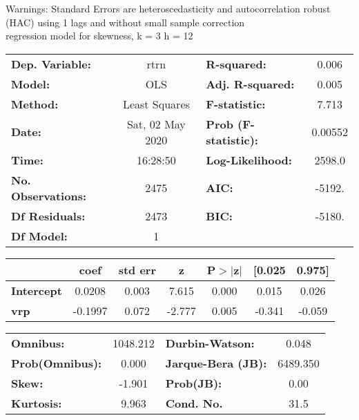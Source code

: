 Warnings: \newline
 [1] Standard Errors are heteroscedasticity and autocorrelation robust (HAC) using 1 lags and without small sample correction\\ 

regression model for skewness, k = 3 h = 12\begin{center}
\begin{tabular}{lclc}
\toprule
\textbf{Dep. Variable:}    &       rtrn       & \textbf{  R-squared:         } &     0.006   \\
\textbf{Model:}            &       OLS        & \textbf{  Adj. R-squared:    } &     0.005   \\
\textbf{Method:}           &  Least Squares   & \textbf{  F-statistic:       } &     7.713   \\
\textbf{Date:}             & Sat, 02 May 2020 & \textbf{  Prob (F-statistic):} &  0.00552    \\
\textbf{Time:}             &     16:28:50     & \textbf{  Log-Likelihood:    } &    2598.0   \\
\textbf{No. Observations:} &        2475      & \textbf{  AIC:               } &    -5192.   \\
\textbf{Df Residuals:}     &        2473      & \textbf{  BIC:               } &    -5180.   \\
\textbf{Df Model:}         &           1      & \textbf{                     } &             \\
\bottomrule
\end{tabular}
\begin{tabular}{lcccccc}
                   & \textbf{coef} & \textbf{std err} & \textbf{z} & \textbf{P$> |$z$|$} & \textbf{[0.025} & \textbf{0.975]}  \\
\midrule
\textbf{Intercept} &       0.0208  &        0.003     &     7.615  &         0.000        &        0.015    &        0.026     \\
\textbf{vrp}       &      -0.1997  &        0.072     &    -2.777  &         0.005        &       -0.341    &       -0.059     \\
\bottomrule
\end{tabular}
\begin{tabular}{lclc}
\textbf{Omnibus:}       & 1048.212 & \textbf{  Durbin-Watson:     } &    0.048  \\
\textbf{Prob(Omnibus):} &   0.000  & \textbf{  Jarque-Bera (JB):  } & 6489.350  \\
\textbf{Skew:}          &  -1.901  & \textbf{  Prob(JB):          } &     0.00  \\
\textbf{Kurtosis:}      &   9.963  & \textbf{  Cond. No.          } &     31.5  \\
\bottomrule
\end{tabular}
\end{center}

